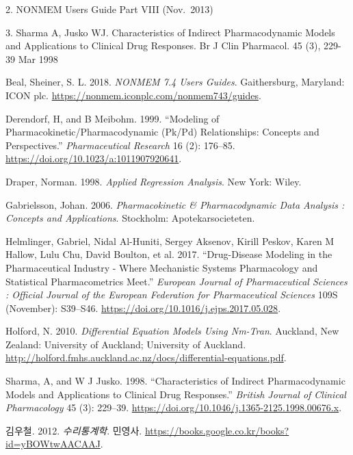 \documentclass[
  10pt,
]{krantz}
\newlength{\cslhangindent}
\newenvironment{cslreferences}%
  {\setlength{\parindent}{0pt}%
  \everypar{\setlength{\hangindent}{\cslhangindent}}\ignorespaces}%
  {\par}
\begin{document}
2. NONMEM Users Guide Part VIII (Nov.~2013)

3. Sharma A, Jusko WJ. Characteristics of Indirect Pharmacodynamic
Models and Applications to Clinical Drug Responses. Br J Clin Pharmacol.
45 (3), 229-39 Mar 1998

\backmatter

\hypertarget{refs}{}
\begin{cslreferences}
\leavevmode\hypertarget{ref-nonmem}{}%
Beal, Sheiner, S. L. 2018. \emph{NONMEM 7.4 Users Guides}. Gaithersburg, Maryland: ICON plc. \url{https://nonmem.iconplc.com/nonmem743/guides}.

\leavevmode\hypertarget{ref-derendorf1999modeling}{}%
Derendorf, H, and B Meibohm. 1999. ``Modeling of Pharmacokinetic/Pharmacodynamic (Pk/Pd) Relationships: Concepts and Perspectives.'' \emph{Pharmaceutical Research} 16 (2): 176--85. \url{https://doi.org/10.1023/a:1011907920641}.

\leavevmode\hypertarget{ref-draper1998applied}{}%
Draper, Norman. 1998. \emph{Applied Regression Analysis}. New York: Wiley.

\leavevmode\hypertarget{ref-gabrielsson2006pharmacokinetic}{}%
Gabrielsson, Johan. 2006. \emph{Pharmacokinetic \& Pharmacodynamic Data Analysis : Concepts and Applications}. Stockholm: Apotekarsocieteten.

\leavevmode\hypertarget{ref-helmlinger2017drug}{}%
Helmlinger, Gabriel, Nidal Al-Huniti, Sergey Aksenov, Kirill Peskov, Karen M Hallow, Lulu Chu, David Boulton, et al. 2017. ``Drug-Disease Modeling in the Pharmaceutical Industry - Where Mechanistic Systems Pharmacology and Statistical Pharmacometrics Meet.'' \emph{European Journal of Pharmaceutical Sciences : Official Journal of the European Federation for Pharmaceutical Sciences} 109S (November): S39--S46. \url{https://doi.org/10.1016/j.ejps.2017.05.028}.

\leavevmode\hypertarget{ref-nickholford}{}%
Holford, N. 2010. \emph{Differential Equation Models Using Nm-Tran}. Auckland, New Zealand: University of Auckland; University of Auckland. \url{http://holford.fmhs.auckland.ac.nz/docs/differential-equations.pdf}.

\leavevmode\hypertarget{ref-sharma1998characteristics}{}%
Sharma, A, and W J Jusko. 1998. ``Characteristics of Indirect Pharmacodynamic Models and Applications to Clinical Drug Responses.'' \emph{British Journal of Clinical Pharmacology} 45 (3): 229--39. \url{https://doi.org/10.1046/j.1365-2125.1998.00676.x}.

\leavevmode\hypertarget{ref-kim}{}%
김우철. 2012. \emph{수리통계학}. 민영사. \url{https://books.google.co.kr/books?id=yBOWtwAACAAJ}.
\end{cslreferences}

\printindex
\end{document}
